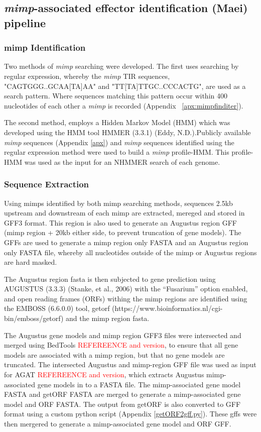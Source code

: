 \subsection{\textit{mimp}-associated effector identification (Maei) pipeline}

\subsubsection{\Ac{mimp} Identification}

Two methods of \textit{mimp} searching were developed. The first uses searching by regular expression, whereby the \textit{mimp} TIR sequences, "CAGTGGG..GCAA[TA]AA" and "TT[TA]TTGC..CCCACTG", are used as a search pattern. Where sequences matching this pattern occur within 400 nucleotides of each other a \textit{mimp} is recorded (Appendix ~\ref{apx:mimpfinditer}). 

The second method, employs a Hidden Markov Model (HMM) which was developed using the HMM tool HMMER (3.3.1) (Eddy, N.D.).Publicly available \textit{mimp} sequences (Appendix \ref{apx}) and \textit{mimp} sequences identified using the regular expression method were used to build a \textit{mimp} profile-HMM. This profile-HMM was used as the input for an NHMMER search of each genome.

\subsubsection{Sequence Extraction}

Using mimps identified by both mimp searching methods, sequences 2.5kb upstream and downstream of each mimp are extracted, mereged and stored in GFF3 format. This region is also used to generate an Augustus region GFF (\ac{mimp} region + 20kb either side, to prevent truncation of gene models). The GFFs are used to generate a \ac{mimp} region only FASTA and an Augustus region only FASTA file, whereby all nucleotides outside of the \ac{mimp} or Augustus regions are hard masked.

The Augustus region fasta is then subjected to gene prediction using AUGUSTUS (3.3.3) (Stanke, et al., 2006) with the “Fusarium” option enabled, and open reading frames (ORFs) withing the mimp regions are identified using the EMBOSS (6.6.0.0) tool, getorf (https://www.bioinformatics.nl/cgi-bin/emboss/getorf) and the mimp region fasta.

The Augustus gene models and \ac{mimp} region GFF3 files were intersected and merged using BedTools \textcolor{red}{REFEREENCE and version}, to ensure that all gene models are associated with a \ac{mimp} region, but that no gene models are truncated. The intersected Augustus and \ac{mimp}-region GFF file was used as input for AGAT \textcolor{red}{REFEREENCE and version}, which extracts Augustus \ac{mimp}-associated gene models in to a FASTA file. The \ac{mimp}-associated gene model FASTA and getORF FASTA are merged to generate a \ac{mimp}-associated gene model and ORF FASTA. The output from getORF is also converted to GFF format using a custom python script (Appendix \ref{getORF2gff.py}). These gffs were then mergered to generate a \ac{mimp}-associated gene model and ORF GFF.


